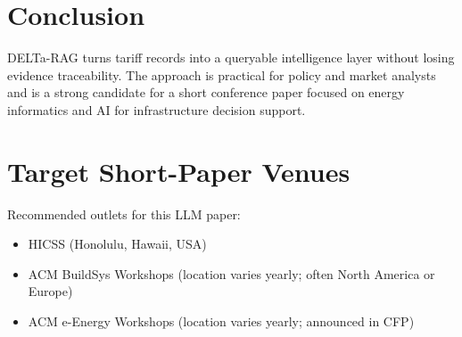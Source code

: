 \documentclass[11pt]{article}
\begin{document}
\section{Conclusion}
DELTa-RAG turns tariff records into a queryable intelligence layer without losing evidence traceability. The approach is practical for policy and market analysts and is a strong candidate for a short conference paper focused on energy informatics and AI for infrastructure decision support.

\section{Target Short-Paper Venues}
Recommended outlets for this LLM paper:
\begin{itemize}
    \item HICSS (Honolulu, Hawaii, USA)
    \item ACM BuildSys Workshops (location varies yearly; often North America or Europe)
    \item ACM e-Energy Workshops (location varies yearly; announced in CFP)
\end{itemize}
\end{document}
